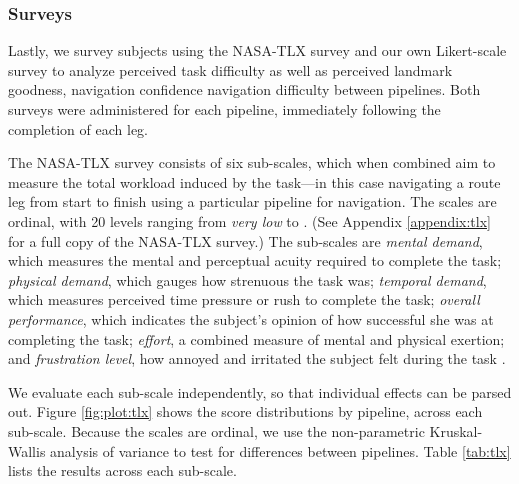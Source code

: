 \subsubsection{Surveys}
Lastly, we survey subjects using the NASA-TLX survey \cite{hart1988development} and our own Likert-scale survey to analyze perceived task difficulty as well as perceived landmark goodness, navigation confidence navigation difficulty between pipelines. Both surveys were administered for each pipeline, immediately following the completion of each leg.

The NASA-TLX survey consists of six sub-scales, which when combined aim to measure the total workload induced by the task---in this case navigating a route leg from start to finish using a particular pipeline for navigation. The scales are ordinal, with 20 levels ranging from \textit{very low} to . (See Appendix \ref{appendix:tlx} for a full copy of the NASA-TLX survey.) The sub-scales are \textit{mental demand}, which measures the mental and perceptual acuity required to complete the task; \textit{physical demand}, which gauges how strenuous the task was; \textit{temporal demand}, which measures perceived time pressure or rush to complete the task; \textit{overall performance}, which indicates the subject's opinion of how successful she was at completing the task; \textit{effort}, a combined measure of mental and physical exertion; and \textit{frustration level}, how annoyed and irritated the subject felt during the task \cite{hart1988development}. 

We evaluate each sub-scale independently, so that individual effects can be parsed out. Figure \ref{fig:plot:tlx} shows the score distributions by pipeline, across each sub-scale. Because the scales are ordinal, we use the non-parametric Kruskal-Wallis analysis of variance to test for differences between pipelines. Table \ref{tab:tlx} lists the results across each sub-scale.

